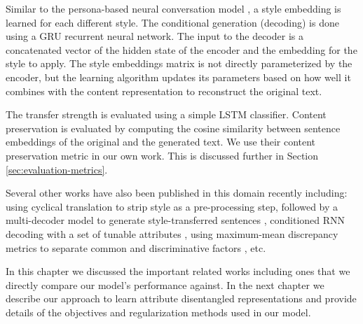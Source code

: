 Similar to the persona-based neural conversation model \citep{li2016persona}, a style embedding is learned for each different style. The conditional generation (decoding) is done using a GRU recurrent neural network. The input to the decoder is a concatenated vector of the hidden state of the encoder and the embedding for the style to apply. The style embeddings matrix is not directly parameterized by the encoder, but the learning algorithm updates its parameters based on how well it combines with the content representation to reconstruct the original text.

The transfer strength is evaluated using a simple LSTM classifier. Content preservation is evaluated by computing the cosine similarity between sentence embeddings of the original and the generated text. We use their content preservation metric in our own work. This is discussed further in Section \ref{sec:evaluation-metrics}.


Several other works have also been published in this domain recently including: using cyclical translation to strip style as a pre-processing step, followed by a multi-decoder model to generate style-transferred sentences \citep{prabhumoye2018style}, conditioned RNN decoding with a set of tunable attributes \citep{ficler2017controlling}, using maximum-mean discrepancy metrics to separate common and discriminative factors \citep{larsson2017disentangled}, etc.



In this chapter we discussed the important related works including ones that we directly compare our model's performance against. In the next chapter we describe our approach to learn attribute disentangled representations and provide details of the objectives and regularization methods used in our model.
